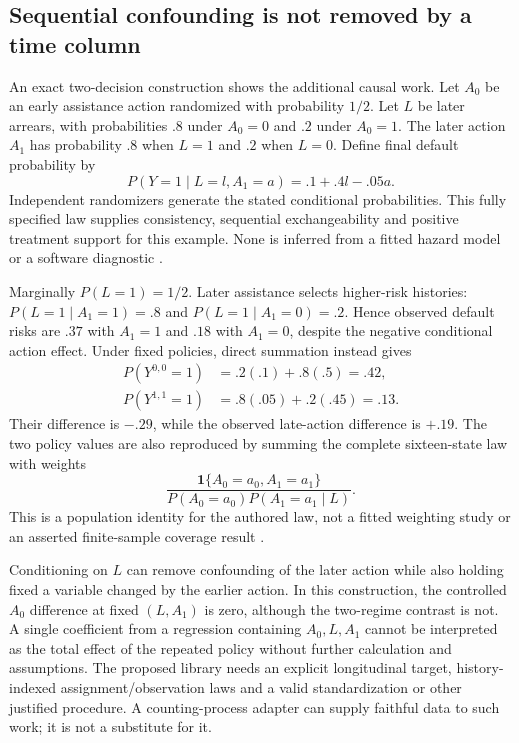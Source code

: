 \subsection{Sequential confounding is not removed by a time column}

An exact two-decision construction shows the additional causal work. Let
$A_0$ be an early assistance action randomized with probability $1/2$.
Let $L$ be later arrears, with probabilities $.8$ under $A_0=0$ and $.2$
under $A_0=1$. The later action $A_1$ has probability $.8$ when $L=1$ and
$.2$ when $L=0$. Define final default probability by
\[
 P(Y=1\mid L=l,A_1=a)=.1+.4l-.05a.
\]
Independent randomizers generate the stated conditional probabilities. This
fully specified law supplies consistency, sequential exchangeability and
positive treatment support for this example. None is inferred from a fitted
hazard model or a software diagnostic \citep{exec14_survival_exact}.

Marginally $P(L=1)=1/2$. Later assistance selects higher-risk histories:
$P(L=1\mid A_1=1)=.8$ and $P(L=1\mid A_1=0)=.2$. Hence observed default
risks are $.37$ with $A_1=1$ and $.18$ with $A_1=0$, despite the negative
conditional action effect. Under fixed policies, direct summation instead gives
\[
 \begin{split}
 P(Y^{0,0}=1)&=.2(.1)+.8(.5)=.42,\\
 P(Y^{1,1}=1)&=.8(.05)+.2(.45)=.13.
 \end{split}
\]
Their difference is $-.29$, while the observed late-action difference is
$+.19$. The two policy values are also reproduced by summing the complete
sixteen-state law with weights
\[
 \frac{\mathbf 1\{A_0=a_0,A_1=a_1\}}
 {P(A_0=a_0)P(A_1=a_1\mid L)}.
\]
This is a population identity for the authored law, not a fitted weighting
study or an asserted finite-sample coverage result
\citep{exec14_survival_exact}.

Conditioning on $L$ can remove confounding of the later action while also
holding fixed a variable changed by the earlier action. In this construction,
the controlled $A_0$ difference at fixed $(L,A_1)$ is zero, although the
two-regime contrast is not. A single coefficient from a regression containing
$A_0,L,A_1$ cannot be interpreted as the total effect of the repeated policy
without further calculation and assumptions. The proposed library needs an
explicit longitudinal target, history-indexed assignment/observation laws
and a valid standardization or other justified procedure. A counting-process
adapter can supply faithful data to such work; it is not a substitute for it.

